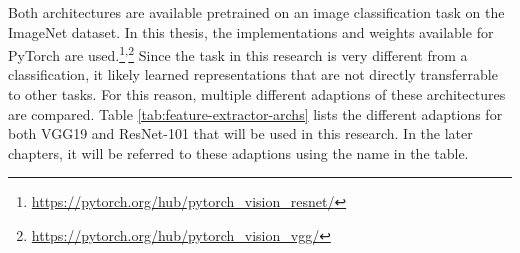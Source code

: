 Both architectures are available pretrained on an image classification task on the ImageNet dataset.
In this thesis, the implementations and weights available for PyTorch are used.\footnote{\href{https://pytorch.org/hub/pytorch\_vision\_resnet/}{https://pytorch.org/hub/pytorch\_vision\_resnet/}}\textsuperscript{,}\footnote{\href{https://pytorch.org/hub/pytorch\_vision\_vgg/}{https://pytorch.org/hub/pytorch\_vision\_vgg/}}
Since the task in this research is very different from a classification, it likely learned representations that are not directly transferrable to other tasks.
For this reason, multiple different adaptions of these architectures are compared.
Table \ref{tab:feature-extractor-archs} lists the different adaptions for both VGG19 and ResNet-101 that will be used in this research.
In the later chapters, it will be referred to these adaptions using the name in the table.

